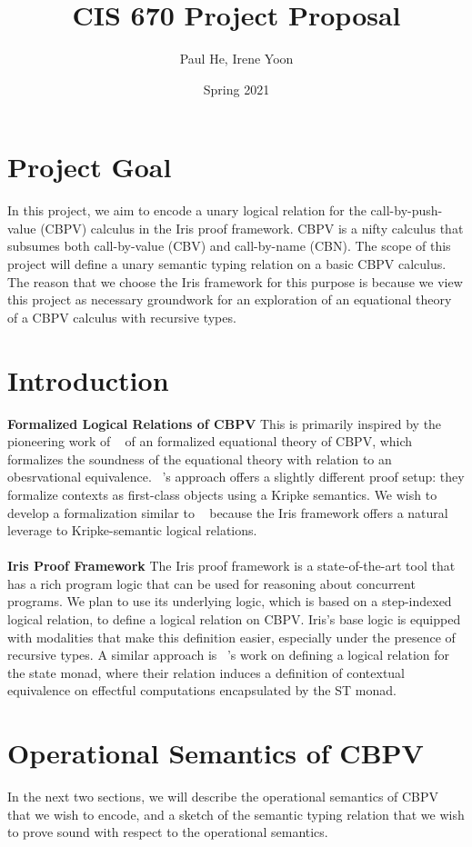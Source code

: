 \documentclass[11pt,twoside]{article}
\begin{document}
\title{CIS 670 Project Proposal}
\author{Paul He, Irene Yoon}
\date{Spring 2021}

\maketitle{}


\section{Project Goal}
In this project, we aim to encode a unary logical relation for the call-by-push-
value (CBPV) calculus in the Iris proof framework. CBPV is a nifty calculus that
subsumes both call-by-value (CBV) and call-by-name (CBN). The scope of this project
will define a unary semantic typing relation on a basic CBPV calculus. The reason
that we choose the Iris framework for this purpose is because we view this project
as necessary groundwork for an exploration of an equational theory of a CBPV
calculus with recursive types. 

\section{Introduction} 

\textbf{Formalized Logical Relations of CBPV}
This is primarily inspired by the pioneering work of 
~\cite{rizkallah} of an formalized equational theory of CBPV, which formalizes the
soundness of the equational theory with relation to an obesrvational equivalence.
~\cite{forster}'s approach offers a slightly different proof setup: they formalize 
contexts as first-class objects using a Kripke semantics.
We wish to develop a formalization similar to ~\cite{forster} because the Iris
framework offers a natural leverage to Kripke-semantic logical relations.\\
\\
\textbf{Iris Proof Framework}
The Iris proof framework is a state-of-the-art tool that has a rich program logic 
that can be used for reasoning about concurrent programs. 
We plan to use its underlying logic, which is based on a 
step-indexed logical relation, to define a logical relation on CBPV.
Iris's base logic is equipped with modalities that make this definition easier,
especially under the presence of recursive types.
A similar approach is ~\cite{timany}'s work on defining a logical relation for 
the state monad, where their relation induces a definition of contextual 
equivalence on effectful computations encapsulated by the ST monad.

\section{Operational Semantics of CBPV}
In the next two sections, we will describe the operational semantics of CBPV that we wish
to encode, and a sketch of the semantic typing relation that we wish to prove sound 
with respect to the operational semantics.


\end{document}
